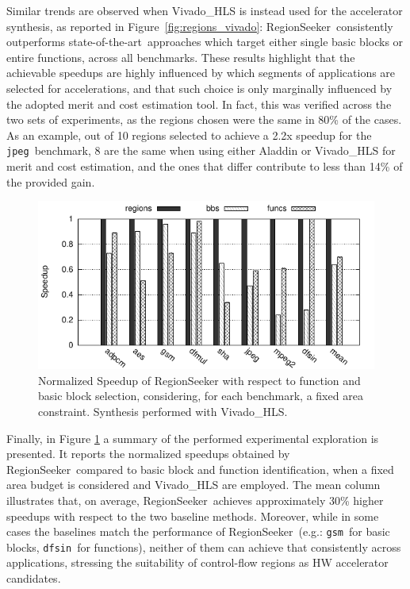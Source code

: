 \documentclass[]{usiinfthesis}
\newcommand{\rseeker}{{RegionSeeker}}
\newcommand{\SoTA}{{state-of-the-art}}
\newcommand{\jpeg}{\texttt{jpeg}}
\newcommand{\dfsin}{\texttt{dfsin}}
\newcommand{\gsm}{\texttt{gsm}}
\begin{document}
Similar trends are observed when Vivado\_HLS is instead used for the
accelerator synthesis, as reported in
Figure~\ref{fig:regions_vivado}: \rseeker\ consistently outperforms
\SoTA\ approaches which target either single basic blocks or
entire functions, across all benchmarks. These results 
highlight that the achievable speedups
are highly influenced by which segments of applications are selected
for accelerations, and that such choice is only marginally influenced
by the adopted merit and cost estimation tool. In fact, this was verified 
across the two sets of experiments, as the regions chosen were
the same in 80\% of the cases. As an example, out of 10 regions
selected to achieve a 2.2x speedup for the \jpeg\ benchmark, 8 are the
same when using either Aladdin or Vivado\_HLS for merit and cost
estimation, and the ones that differ contribute to less than 14\% of
the provided gain.\par


\begin{figure}[h!]
\centering
\includegraphics[width= 0.9 \linewidth]{figs/rbf_max_norm_all}
\caption{Normalized Speedup of RegionSeeker with respect to function and basic block selection, 
considering, for each benchmark, a fixed area constraint. Synthesis performed with Vivado\_HLS.}
\label{fig:regions_all}
\end{figure}

Finally, in Figure \ref{fig:regions_all} a summary of the performed experimental 
exploration is presented. It reports the normalized speedups
obtained by \rseeker\ compared to basic block and function
identification, when a fixed area budget is considered and
Vivado\_HLS are employed. The mean column illustrates that,
on average, \rseeker\ achieves approximately 30\% higher speedups
with respect to the two baseline methods. Moreover, while in some
cases the baselines match the performance of \rseeker\ (e.g.: \gsm\
for basic blocks, \dfsin\ for functions), neither of them can achieve that
consistently across applications, stressing the suitability of control-flow regions as
HW accelerator candidates.\par
\end{document}
